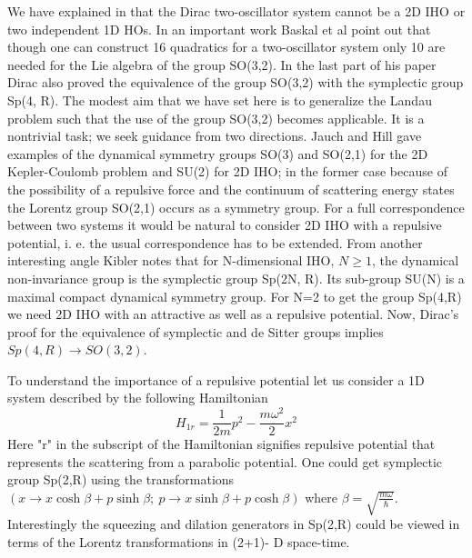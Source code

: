 \documentclass[aps, singlecolumn, showpacs]{revtex4-2}
\begin{document}
We have explained in \cite{16} that the Dirac two-oscillator system cannot be a 2D IHO or two independent 1D HOs. In an important work Baskal et al \cite{17} point out that though one can construct 16 quadratics for a two-oscillator system only 10 are needed for the Lie algebra of the group SO(3,2). In the last part of his paper \cite{15} Dirac also proved the equivalence of the group SO(3,2) with the symplectic group Sp(4, R). The modest aim that we have set here is to generalize the Landau problem such that the use of the group SO(3,2) becomes applicable. It is a nontrivial task; we seek guidance from two directions. Jauch and Hill \cite{19} gave examples of the dynamical symmetry groups SO(3) and SO(2,1) for the 2D Kepler-Coulomb problem and SU(2) for 2D IHO; in the former case because of the possibility of a repulsive force and the continuum of scattering energy states the Lorentz group SO(2,1) occurs as a symmetry group. For a full correspondence between two systems it would be natural to consider 2D IHO with a repulsive potential, i. e. the usual correspondence \cite{25} has to be extended. From another interesting angle Kibler \cite{18} notes that for N-dimensional IHO, $N \geq 1$,  the dynamical non-invariance group is the symplectic group Sp(2N, R). Its sub-group SU(N) is a maximal compact dynamical symmetry group. For N=2 to get the group Sp(4,R) we need 2D IHO with an attractive as well as a repulsive potential. Now, Dirac's proof for the equivalence of symplectic and de Sitter groups implies $Sp(4,R) \rightarrow SO(3,2)$.

To understand the importance of a repulsive potential let us consider a 1D system described by the following Hamiltonian
\begin{equation}
H_{1r}= \frac{1}{2m} p^2 - \frac{m \omega^2}{2} x^2
\end{equation}
Here "r" in the subscript of the Hamiltonian signifies repulsive potential that represents the scattering from a parabolic potential. One could get symplectic group Sp(2,R) using the transformations $(x \rightarrow x \cosh \beta + p \sinh \beta ;~ p \rightarrow x \sinh \beta  + p \cosh \beta)$ where $\beta = \sqrt{ \frac{m \omega}{\hbar}}$. Interestingly the squeezing and dilation generators in Sp(2,R) could be viewed in terms of the Lorentz transformations in (2+1)- D space-time. 
\end{document}
